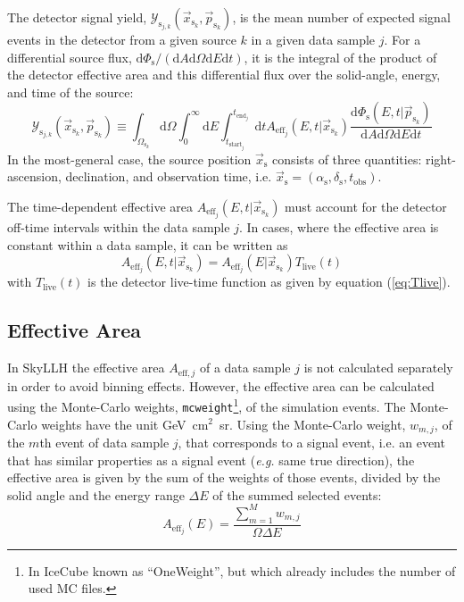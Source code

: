 \documentclass{article}
\newcommand{\code}[1]{\texttt{#1}}
\newcommand{\psk}{\vec{p}_{\mathrm{s}_k}}
\newcommand{\xs}{\vec{x}_{\mathrm{s}}}
\newcommand{\xsk}{\vec{x}_{\mathrm{s}_k}}
\begin{document}
The detector signal yield, $\mathcal{Y}_{\mathrm{s}_{j,k}}(\xsk,\psk)$,
is the mean number of expected signal events in the detector from a given
source $k$ in a given data sample $j$. For a differential source flux,
$\mathrm{d}\Phi_{\mathrm{s}}/(\mathrm{d}A\mathrm{d}\Omega\mathrm{d}E\mathrm{d}t)$,
it is the integral of the product of the detector effective area and this
differential flux over the solid-angle, energy, and time of the source:
\begin{equation}
 \mathcal{Y}_{\mathrm{s}_{j,k}}(\xsk,\psk) \equiv \int_{\Omega_{\mathrm{s}_k}} \mathrm{d}\Omega \int_0^\infty \mathrm{d}E \int_{t_{\mathrm{start}_j}}^{t_{\mathrm{end}_j}}\mathrm{d}t A_{\mathrm{eff}_j}(E,t|\xsk) \frac{\mathrm{d}\Phi_{\mathrm{s}}(E,t|\psk)}{\mathrm{d}A\mathrm{d}\Omega\mathrm{d}E\mathrm{d}t}
\label{eq:Ysj}
\end{equation}
In the most-general case, the source position $\xs$ consists of three
quantities: right-ascension, declination, and observation time, i.e.
$\xs = (\alpha_{\mathrm{s}},\delta_{\mathrm{s}},t_{\mathrm{obs}})$.

The time-dependent effective area $A_{\mathrm{eff}_j}(E,t|\xsk)$ must account
for the detector off-time intervals within the data sample $j$. In cases, where
the effective area is constant within a data sample, it can be written as
\begin{equation}
 A_{\mathrm{eff}_j}(E,t|\xsk) = A_{\mathrm{eff}_j}(E|\xsk) T_{\mathrm{live}}(t)
\end{equation}
with $T_{\mathrm{live}}(t)$ is the detector live-time function as given by
equation (\ref{eq:Tlive}).

\subsection{Effective Area}

In SkyLLH the effective area $A_{\mathrm{eff},j}$ of a data sample $j$ is not
calculated separately in order to avoid binning effects. However, the effective
area can be calculated using the Monte-Carlo weights, \code{mcweight}\footnote{In IceCube
known as ``OneWeight'', but which already includes the number of used MC files.},
of the simulation events.
The Monte-Carlo weights have the unit GeV~cm$^2$~sr.
Using the Monte-Carlo weight, $w_{m,j}$, of the $m$th event of data sample $j$,
that corresponds to a signal event, i.e. an event that has similar properties as
a signal event (\emph{e.g.} same true direction), the effective area is given by
the sum of the weights of those events, divided by the
solid angle and the energy range $\Delta E$ of the summed selected events:
\begin{equation}
 A_{\mathrm{eff}_j}(E) = \frac{\sum_{m=1}^{M} w_{m,j}}{\Omega \Delta E}
\end{equation}
\end{document}
